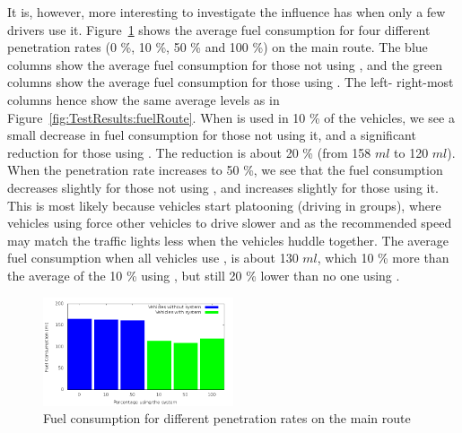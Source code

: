 It is, however, more interesting to investigate the influence \tech has when only a few drivers use it.
Figure~\ref{fig:TestResults:combinedFuel} shows the average fuel consumption for four different penetration rates (0 \%, 10 \%, 50 \% and 100 \%) on the main route.
The blue columns show the average fuel consumption for those not using \tech, and the green columns show the average fuel consumption for those using \tech.
The left- right-most columns hence show the same average levels as in Figure~\ref{fig:TestResults:fuelRoute}.
When \tech is used in 10 \% of the vehicles, we see a small decrease in fuel consumption for those not using it, and a significant reduction for those using \tech.
The reduction is about 20 \% (from 158 $ml$ to 120 $ml$).
When the penetration rate increases to 50 \%, we see that the fuel consumption decreases slightly for those not using \tech, and increases slightly for those using it.
This is most likely because vehicles start platooning (driving in groups), where vehicles using \tech force other vehicles to drive slower and as the recommended speed may match the traffic lights less when the vehicles huddle together.
The average fuel consumption when all vehicles use \tech, is about 130 $ml$, which 10 \% more than the average of the 10 \% using \tech, but still 20 \% lower than no one using \tech.

\begin{figure}[h]
\includegraphics[width=0.5\textwidth]{../images/tp0c1_0/combinedFuel.png}
\caption{Fuel consumption for different penetration rates on the main route}
\label{fig:TestResults:combinedFuel}
\end{figure}

